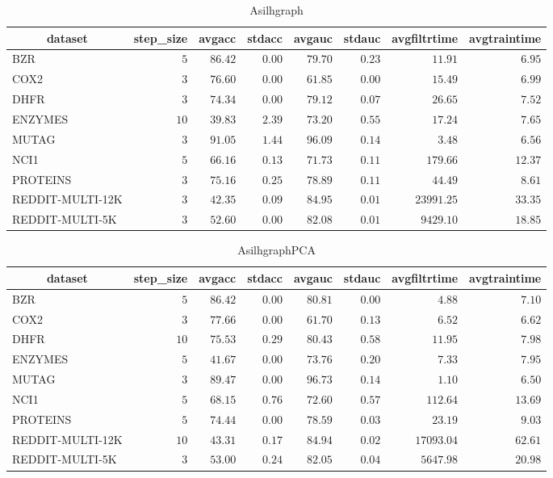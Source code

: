 \begin{table}[!tbp]
\caption{Asilhgraph\label{Asilhgraph}} 
{\centering
\begin{tabular}{lrrrrrrr}
\hline\hline
\multicolumn{1}{c}{dataset}&\multicolumn{1}{c}{step_size}&\multicolumn{1}{c}{avgacc}&\multicolumn{1}{c}{stdacc}&\multicolumn{1}{c}{avgauc}&\multicolumn{1}{c}{stdauc}&\multicolumn{1}{c}{avgfiltrtime}&\multicolumn{1}{c}{avgtraintime}\tabularnewline
\hline
BZR&$ 5$&$86.42$&$0.00$&$79.70$&$0.23$&$   11.91$&$ 6.95$\tabularnewline
COX2&$ 3$&$76.60$&$0.00$&$61.85$&$0.00$&$   15.49$&$ 6.99$\tabularnewline
DHFR&$ 3$&$74.34$&$0.00$&$79.12$&$0.07$&$   26.65$&$ 7.52$\tabularnewline
ENZYMES&$10$&$39.83$&$2.39$&$73.20$&$0.55$&$   17.24$&$ 7.65$\tabularnewline
MUTAG&$ 3$&$91.05$&$1.44$&$96.09$&$0.14$&$    3.48$&$ 6.56$\tabularnewline
NCI1&$ 5$&$66.16$&$0.13$&$71.73$&$0.11$&$  179.66$&$12.37$\tabularnewline
PROTEINS&$ 3$&$75.16$&$0.25$&$78.89$&$0.11$&$   44.49$&$ 8.61$\tabularnewline
REDDIT-MULTI-12K&$ 3$&$42.35$&$0.09$&$84.95$&$0.01$&$23991.25$&$33.35$\tabularnewline
REDDIT-MULTI-5K&$ 3$&$52.60$&$0.00$&$82.08$&$0.01$&$ 9429.10$&$18.85$\tabularnewline
\hline
\end{tabular}}
\end{table}
\begin{table}[!tbp]
\caption{AsilhgraphPCA\label{AsilhgraphPCA}} 
{\centering
\begin{tabular}{lrrrrrrr}
\hline\hline
\multicolumn{1}{c}{dataset}&\multicolumn{1}{c}{step_size}&\multicolumn{1}{c}{avgacc}&\multicolumn{1}{c}{stdacc}&\multicolumn{1}{c}{avgauc}&\multicolumn{1}{c}{stdauc}&\multicolumn{1}{c}{avgfiltrtime}&\multicolumn{1}{c}{avgtraintime}\tabularnewline
\hline
BZR&$ 5$&$86.42$&$0.00$&$80.81$&$0.00$&$    4.88$&$ 7.10$\tabularnewline
COX2&$ 3$&$77.66$&$0.00$&$61.70$&$0.13$&$    6.52$&$ 6.62$\tabularnewline
DHFR&$10$&$75.53$&$0.29$&$80.43$&$0.58$&$   11.95$&$ 7.98$\tabularnewline
ENZYMES&$ 5$&$41.67$&$0.00$&$73.76$&$0.20$&$    7.33$&$ 7.95$\tabularnewline
MUTAG&$ 3$&$89.47$&$0.00$&$96.73$&$0.14$&$    1.10$&$ 6.50$\tabularnewline
NCI1&$ 5$&$68.15$&$0.76$&$72.60$&$0.57$&$  112.64$&$13.69$\tabularnewline
PROTEINS&$ 5$&$74.44$&$0.00$&$78.59$&$0.03$&$   23.19$&$ 9.03$\tabularnewline
REDDIT-MULTI-12K&$10$&$43.31$&$0.17$&$84.94$&$0.02$&$17093.04$&$62.61$\tabularnewline
REDDIT-MULTI-5K&$ 3$&$53.00$&$0.24$&$82.05$&$0.04$&$ 5647.98$&$20.98$\tabularnewline
\hline
\end{tabular}}
\end{table}
